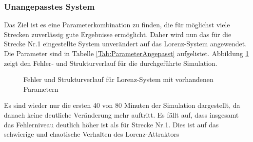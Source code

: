             \subsubsection{Unangepasstes System}
                Das Ziel ist es eine Parameterkombination zu finden, die für möglichst viele Strecken zuverlässig gute Ergebnisse ermöglicht. Daher wird nun das für die 
                Strecke Nr.1 eingestellte System unverändert auf das Lorenz-System angewendet. Die Parameter sind in Tabelle \ref{Tab:ParameterAngepasst} aufgelistet. 
                Abbildung \ref{Abb:RealTime_Testreihe201} zeigt den Fehler- und Strukturverlauf für die durchgeführte Simulation.
                \begin{figure}[h]
                    \caption{Fehler und Strukturverlauf für Lorenz-System mit vorhandenen Parametern}
                    \label{Abb:RealTime_Testreihe201}
                \end{figure} 
                Es sind wieder nur die ersten 40 von 80 Minuten der Simulation dargestellt, da danach keine deutliche Veränderung mehr auftritt. 
                Es fällt auf, dass insgesamt das Fehlerniveau deutlich höher ist als für Strecke Nr.1. Dies ist auf das schwierige und chaotische Verhalten des Lorenz-Attraktors 
